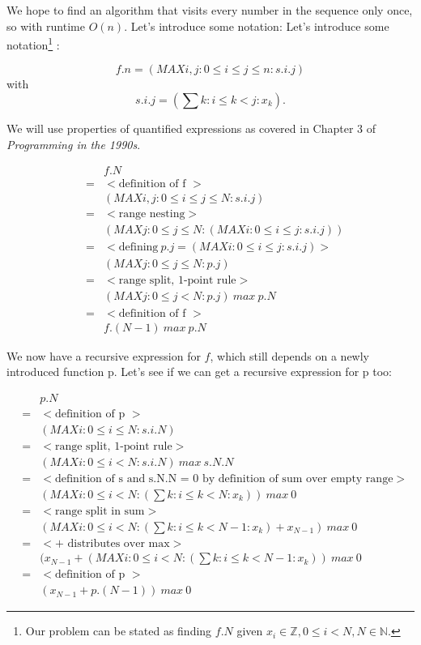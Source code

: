 We hope to find an algorithm that visits every number in the sequence only once, so with runtime $O(n)$. Let's introduce some notation:
Let's introduce some notation\footnote{Our problem can be stated as finding $f.N$ given $x_i \in \mathbb{Z}, 0 \leq i < N, N \in \mathbb{N}$.}
:

\[
	f.n = (MAX i, j : 0 \leq i \leq j \leq n : s.i.j) 
\]
with 
\[	 
	s.i.j = (\sum k : i \leq k < j : x_k).
\]

We will use properties of quantified expressions as covered in Chapter 3 of \textit{Programming in the 1990s}\cite{Cohen90}.

\[
\begin{array}{lcl}
		&&f.N \\
	      &=& { < \mbox{definition of f } >} \\      
                  && (MAX i, j : 0 \leq i \leq j \leq N : s.i.j)\\
                &=& { < \mbox{range nesting} >} \\
                  && (MAX j : 0 \leq j \leq N : (MAX i:  0 \leq i \leq j : s.i.j)) \\
                &=& { < \mbox{defining}\  p.j =  (MAX i:  0 \leq i \leq j : s.i.j) >} \\ 
                   && (MAX j : 0 \leq j \leq N : p.j) \\
                &=& { < \mbox{range split, 1-point rule} >} \\
                	 && (MAX j : 0 \leq j < N : p.j) \ max \ p.N \\
	       &=& { < \mbox{definition of f } >} \\
	       	&& f.(N - 1) \ max \ p.N 	   
   \end{array}
\]

We now have a recursive expression for $f$, which still depends on a newly introduced function p. Let's see if we can get a recursive expression for p too:

\[
\begin{array}{lcl}
		&&p.N \\
		&=& { < \mbox{definition of p } >} \\
		 && (MAX i:  0 \leq i \leq N : s.i.N) \\
		 &=& { < \mbox{range split, 1-point rule} >} \\
		 && (MAX i:  0 \leq i < N : s.i.N)\ max \ s.N.N \\
		 &=& { < \mbox{definition of s and s.N.N = 0 by definition of sum over empty range} >} \\
		 && (MAX i:  0 \leq i < N : (\sum k : i \leq k < N : x_k))\ max \ 0 \\
		 &=& { < \mbox{range split in sum} >} \\
		 && (MAX i:  0 \leq i < N : (\sum k : i \leq k < N - 1 : x_k) + x_{N - 1})\ max \ 0 \\
		 &=& { < \mbox{+ distributes over max} >} \\
		 && (x_{N - 1} + (MAX i:  0 \leq i < N : (\sum k : i \leq k < N - 1 : x_k))\ max \ 0 \\
		 &=& { < \mbox{definition of p } >} \\
		 && (x_{N - 1} + p.(N - 1))\ max \ 0
   \end{array}
\]

